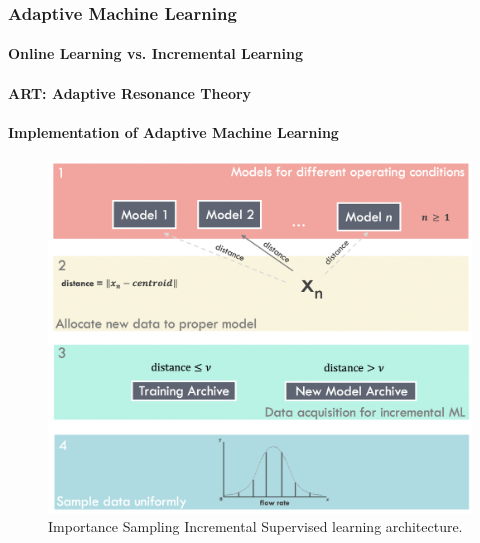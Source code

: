 \subsubsection{Adaptive Machine Learning}
\paragraph{Online Learning vs. Incremental Learning}
\paragraph{ART: Adaptive Resonance Theory}
\paragraph{Implementation of Adaptive Machine Learning}

\begin{figure}
    \centering
    \includegraphics[width=\textwidth]{images/08IncrementalLearning.png}
    \caption{Importance Sampling Incremental Supervised learning architecture.}
    \label{fig:08ART}
\end{figure}


